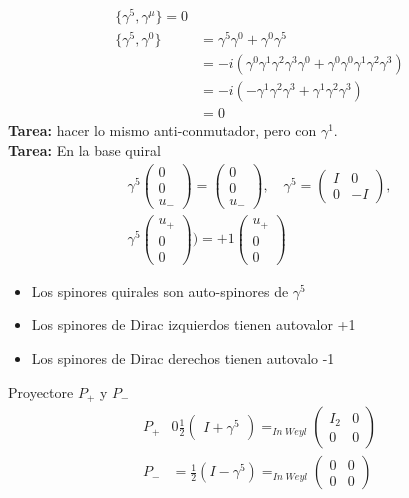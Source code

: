 \documentclass[../main.tex]{subfiles}
\begin{document}
 \begin{align*}
   \{\gamma^5,\gamma^\mu\} = 0 \\
   \{\gamma^5,\gamma^0\} & = \gamma^5\gamma^0 + \gamma^0 \gamma^5 \\
   & = -i \left( \gamma^0 \gamma^1 \gamma^2 \gamma^3 \gamma^0 + \gamma^0 \gamma^0 \gamma^1 \gamma^2 \gamma^3 \right) \\
  & = -i \left( -\gamma^1 \gamma^2 \gamma^3 + \gamma^1 \gamma^2 \gamma^3 \right) \\
   & = 0
 \end{align*}
 \textbf{Tarea:} hacer lo mismo anti-conmutador, pero con $\gamma^1$. \\
 \textbf{Tarea:} En la base quiral
 \begin{align*}
   \gamma^5 \begin{pmatrix}
     0 \\ 0 \\ u_-
   \end{pmatrix} = 
   \begin{pmatrix}
     0 \\ 0 \\ u_-
   \end{pmatrix}
   , \quad \gamma^5 = 
   \begin{pmatrix}
     I & 0 \\ 0 & -I
   \end{pmatrix}, \\
   \gamma^5 \begin{pmatrix}
     u_+ \\ 0 \\ 0
   \end{pmatrix} ) =+1
   \begin{pmatrix}
     u_+ \\ 0 \\ 0
   \end{pmatrix}
 \end{align*}
 \begin{itemize}
  \item Los spinores quirales son auto-spinores de $\gamma^5$ 
   \item Los spinores de Dirac izquierdos tienen autovalor +1
   \item Los spinores de Dirac derechos tienen autovalo -1
 \end{itemize}
 Proyectore $P_+$ y $P_-$
 \begin{align*}
   P_+ & 0 \frac{1}{2}\begin{pmatrix}
     I + \gamma^5
   \end{pmatrix} =_{In\; Weyl} \begin{pmatrix}
     I_2 & 0 \\ 0 & 0
   \end{pmatrix} \\
   P_- & = \frac{1}{2}\left( I-\gamma^5 \right) =_{In\; Weyl} \begin{pmatrix}
    0 & 0 \\ 0 & 0
   \end{pmatrix}
 \end{align*}
\end{document}
